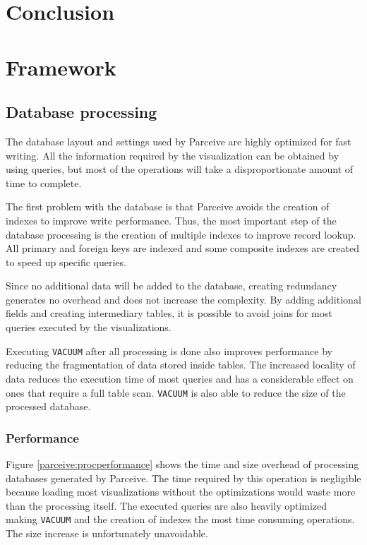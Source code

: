 \documentclass[conference]{IEEEtran}
\begin{document}
\section{Conclusion}
\label{sec:conclusion}

\section{Framework}

\subsection{Database processing}
\label{dataprocessing}

The database layout and settings used by Parceive are highly optimized for fast writing. All the information required by the visualization can be obtained by using queries, but most of the operations will take a disproportionate amount of time to complete.

The first problem with the database is that Parceive avoids the creation of indexes to improve write performance. Thus, the most important step of the database processing is the creation of multiple indexes to improve record lookup. All primary and foreign keys are indexed and some composite indexes are created to speed up specific queries.

Since no additional data will be added to the database, creating redundancy generates no overhead and does not increase the complexity. By adding additional fields and creating intermediary tables, it is possible to avoid joins for most queries executed by the visualizations. 

Executing \texttt{VACUUM} after all processing is done also improves performance by reducing the fragmentation of data stored inside tables. The increased locality of data reduces the execution time of most queries and has a considerable effect on ones that require a full table scan. \texttt{VACUUM} is also able to reduce the size of the processed database.

\subsubsection*{Performance}

Figure \ref{parceive:procperformance} shows the time and size overhead of processing databases generated by Parceive. The time required by this operation is negligible because loading most visualizations without the optimizations would waste more than the processing itself. The executed queries are also heavily optimized making \texttt{VACUUM} and the creation of indexes the most time consuming operations. The size increase is unfortunately unavoidable.
\end{document}
